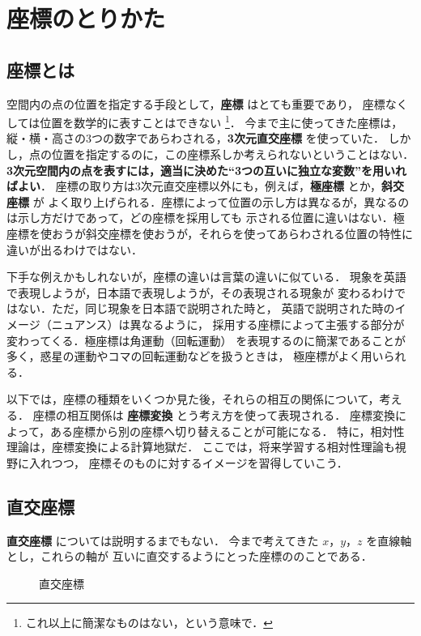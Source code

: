 \section{座標のとりかた}
\subsection{座標とは}
    空間内の点の位置を指定する手段として，\textbf{座標} はとても重要であり，
    座標なくしては位置を数学的に表すことはできない
        \footnote{
            これ以上に簡潔なものはない，という意味で．
        }．
    今まで主に使ってきた座標は，縦・横・高さの3つの数字であらわされる，\textbf{3次元直交座標} を使っていた．
    しかし，点の位置を指定するのに，この座標系しか考えられないということはない．
    \textbf{3次元空間内の点を表すには，適当に決めた“3つの互いに独立な変数”を用いればよい}．
    座標の取り方は3次元直交座標以外にも，例えば，\textbf{極座標} とか，\textbf{斜交座標} が
    よく取り上げられる．座標によって位置の示し方は異なるが，異なるのは示し方だけであって，どの座標を採用しても
    示される位置に違いはない．極座標を使おうが斜交座標を使おうが，それらを使ってあらわされる位置の特性に
    違いが出るわけではない．

    下手な例えかもしれないが，座標の違いは言葉の違いに似ている．
    現象を英語で表現しようが，日本語で表現しようが，その表現される現象が
    変わるわけではない．ただ，同じ現象を日本語で説明された時と，
    英語で説明された時のイメージ（ニュアンス）は異なるように，
    採用する座標によって主張する部分が変わってくる．極座標は角運動（回転運動）
    を表現するのに簡潔であることが多く，惑星の運動やコマの回転運動などを扱うときは，
    極座標がよく用いられる．

    以下では，座標の種類をいくつか見た後，それらの相互の関係について，考える．
    座標の相互関係は \textbf{座標変換} とう考え方を使って表現される．
    座標変換によって，ある座標から別の座標へ切り替えることが可能になる．
    特に，相対性理論は，座標変換による計算地獄だ．
    ここでは，将来学習する相対性理論も視野に入れつつ，
    座標そのものに対するイメージを習得していこう．

\subsection{直交座標}
    \textbf{直交座標} については説明するまでもない．
    今まで考えてきた $x$，$y$，$z$ を直線軸とし，これらの軸が
    互いに直交するようにとった座標ののことである．
        \begin{figure}[hbt]
            \begin{center}
                \caption{直交座標}
                \label{fig:chokkou}
            \end{center}
        \end{figure}

